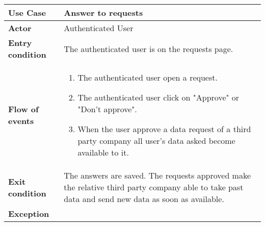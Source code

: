 \documentclass[../main.tex]{subfiles}
\begin{document}
	\vspace*{3cm}
	\begin{center}
		\begin{tabular}{p{3cm}p{8.28cm}}
			\hline
			\textbf{Use Case} & Answer to requests\\
			\hline
			\textbf{Actor} & Authenticated User\\
			\hline
			\textbf{Entry condition} & The authenticated user is on the requests page.\\
			\hline
			\textbf{Flow of events} & \begin{enumerate}
				\linespread{0}\item The authenticated user open a request.
				\linespread{0}\item The authenticated user click on "Approve" or "Don't approve".
				\linespread{0}\item When the user approve a data request of a third party company all user's data asked become available to it.
			\end{enumerate}\\
			\hline
			\textbf{Exit condition} & The answers are saved. The requests approved make the relative third party company able to take past data and send new data as soon as available.\\
			\hline
			\textbf{Exception}\\
			\hline
		\end{tabular}
	\end{center}
	\vspace*{3cm}
\end{document}

